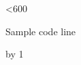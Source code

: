 \documentclass{article}
\begin{document}
\loop\ifnum\ct<600
  \begin{cb}Sample code line \the\ct\end{cb}
  \advance\ct by 1
\repeat
\end{document}

